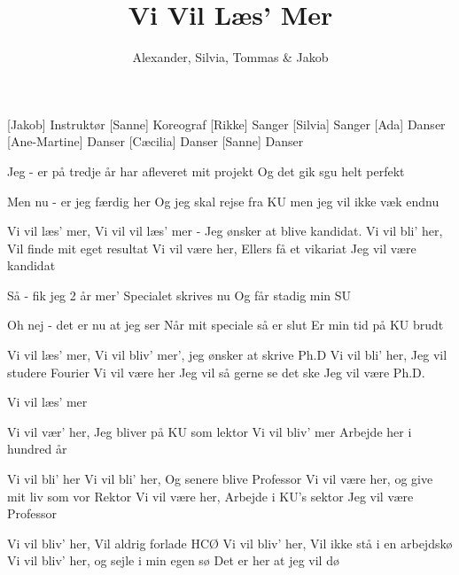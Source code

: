 \documentclass[a4paper,11pt]{article}
\title{Vi Vil Læs' Mer}
\author{Alexander, Silvia, Tommas \& Jakob}
\begin{document}
\maketitle

\begin{roles}
[Jakob] Instruktør
[Sanne] Koreograf
[Rikke] Sanger
[Silvia] Sanger
[Ada] Danser
[Ane-Martine] Danser
[Cæcilia] Danser
[Sanne] Danser
\end{roles}

\begin{song}

 Jeg - er på tredje år
har afleveret mit projekt
Og det gik sgu helt perfekt

 Men nu - er jeg færdig her
Og jeg skal rejse fra KU 
men jeg vil ikke væk endnu %

 Vi vil læs' mer, 
 Vi vil vil læs' mer - Jeg ønsker at blive kandidat.
 Vi vil bli' her, 
 Vil finde mit eget resultat
 Vi vil være her, 
 Ellers få et vikariat
Jeg vil være kandidat

 Så - fik jeg 2 år mer'
Specialet skrives nu
Og får stadig min SU

 Oh nej - det er nu at jeg ser
Når mit speciale så er slut
Er min tid på KU brudt

Vi vil læs' mer, 
 Vi  vil bliv' mer', jeg ønsker at skrive Ph.D
 Vi vil bli' her,
 Jeg vil studere Fourier
Vi vil være her 
 Jeg vil så gerne se det ske
Jeg vil være Ph.D.

 Vi vil læs' mer

 Vi vil vær' her, 
 Jeg bliver på KU som lektor
 Vi vil bliv' mer 
 Arbejde her i hundred år

 Vi vil bli' her  
 Vi vil bli' her, Og senere blive Professor
 Vi vil være her, 
 og give mit liv som vor Rektor
 Vi vil være her, 
 Arbejde i KU's sektor
Jeg vil være Professor %

 Vi vil bliv' her, 
 Vil aldrig forlade HCØ
 Vi vil bliv' her, 
 Vil ikke stå i en arbejdskø  %
 Vi vil bliv' her, 
 og sejle i min egen sø %
Det er her at jeg vil dø


\end{song}
\end{document}
